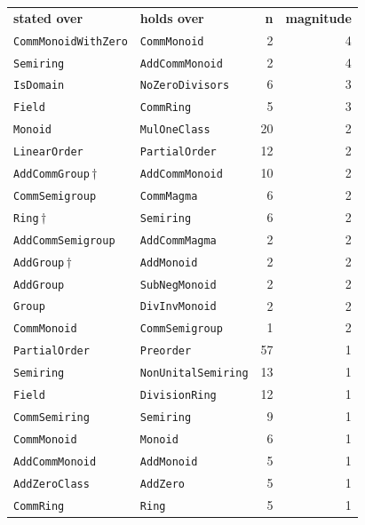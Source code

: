 \documentclass[10pt,a4paper]{article}
\begin{document}
\begin{center}
\begin{tabular}{llrr}
\textbf{stated over} & \textbf{holds over} & \textbf{n} & \textbf{magnitude}\\[2pt]
\texttt{\small CommMonoidWithZero} & \texttt{\small CommMonoid} & 2 & 4\\
\texttt{\small Semiring} & \texttt{\small AddCommMonoid} & 2 & 4\\
\texttt{\small IsDomain} & \texttt{\small NoZeroDivisors} & 6 & 3\\
\texttt{\small Field} & \texttt{\small CommRing} & 5 & 3\\
\texttt{\small Monoid} & \texttt{\small MulOneClass} & 20 & 2\\
\texttt{\small LinearOrder} & \texttt{\small PartialOrder} & 12 & 2\\
\texttt{\small AddCommGroup}\,$\dagger$ & \texttt{\small AddCommMonoid} & 10 & 2\\
\texttt{\small CommSemigroup} & \texttt{\small CommMagma} & 6 & 2\\
\texttt{\small Ring}\,$\dagger$ & \texttt{\small Semiring} & 6 & 2\\
\texttt{\small AddCommSemigroup} & \texttt{\small AddCommMagma} & 2 & 2\\
\texttt{\small AddGroup}\,$\dagger$ & \texttt{\small AddMonoid} & 2 & 2\\
\texttt{\small AddGroup} & \texttt{\small SubNegMonoid} & 2 & 2\\
\texttt{\small Group} & \texttt{\small DivInvMonoid} & 2 & 2\\
\texttt{\small CommMonoid} & \texttt{\small CommSemigroup} & 1 & 2\\
\texttt{\small PartialOrder} & \texttt{\small Preorder} & 57 & 1\\
\texttt{\small Semiring} & \texttt{\small NonUnitalSemiring} & 13 & 1\\
\texttt{\small Field} & \texttt{\small DivisionRing} & 12 & 1\\
\texttt{\small CommSemiring} & \texttt{\small Semiring} & 9 & 1\\
\texttt{\small CommMonoid} & \texttt{\small Monoid} & 6 & 1\\
\texttt{\small AddCommMonoid} & \texttt{\small AddMonoid} & 5 & 1\\
\texttt{\small AddZeroClass} & \texttt{\small AddZero} & 5 & 1\\
\texttt{\small CommRing} & \texttt{\small Ring} & 5 & 1\\

\end{tabular}
\end{center}
\end{document}
